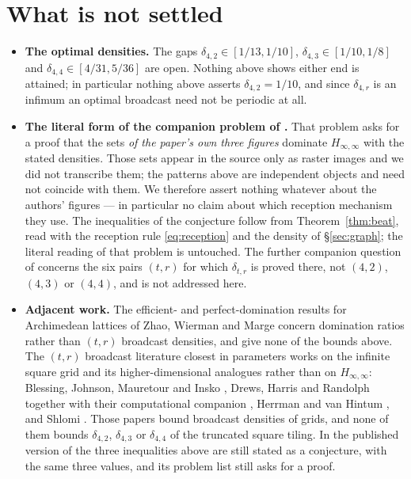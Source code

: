 \documentclass[11pt]{amsart}
\theoremstyle{definition}
\begin{document}
\section{What is not settled}\label{sec:open}

\begin{itemize}
\item \textbf{The optimal densities.} The gaps
$\delta_{4,2}\in[1/13,1/10]$, $\delta_{4,3}\in[1/10,1/8]$ and
$\delta_{4,4}\in[4/31,5/36]$ are open. Nothing above shows either end is attained; in
particular nothing above asserts $\delta_{4,2}=1/10$, and since $\delta_{4,r}$ is an infimum an
optimal broadcast need not be periodic at all.
\item \textbf{The literal form of the companion problem of \cite{CervantesHarris}.} That
problem asks for a proof that the sets \emph{of the paper's own three figures} dominate
$H_{\infty,\infty}$ with the stated densities. Those sets appear in the source only as raster
images and we did not transcribe them; the patterns above are independent objects and need not
coincide with them. We therefore assert nothing whatever about the authors' figures --- in
particular no claim about which reception mechanism they use. The inequalities of the conjecture
follow from Theorem~\ref{thm:beat}, read with the reception rule \eqref{eq:reception} and the
density of \S\ref{sec:graph}; the literal reading of that problem is untouched. The further
companion question of \cite{CervantesHarris} concerns the six pairs $(t,r)$ for which
$\delta_{t,r}$ is proved there, not $(4,2)$, $(4,3)$ or $(4,4)$, and is not addressed here.
\item \textbf{Adjacent work.} The efficient- and perfect-domination results for Archimedean
lattices of Zhao, Wierman and Marge \cite{ZWM2018,ZWM2022} concern domination ratios rather than
$(t,r)$ broadcast densities, and give none of the bounds above. The $(t,r)$ broadcast literature
closest in parameters works on the infinite square grid and its higher-dimensional analogues
rather than on $H_{\infty,\infty}$: Blessing, Johnson, Mauretour and Insko \cite{BJMI}, Drews,
Harris and Randolph \cite{DHR} together with their computational companion \cite{DHRupper},
Herrman and van Hintum \cite{HvH}, and Shlomi \cite{Shlomi}. Those papers bound broadcast
densities of grids, and none of them bounds $\delta_{4,2}$, $\delta_{4,3}$ or $\delta_{4,4}$ of
the truncated square tiling. In the published version of \cite{CervantesHarris} the three
inequalities above are still stated as a conjecture, with the same three values, and its problem
list still asks for a proof.
\end{itemize}
\end{document}
